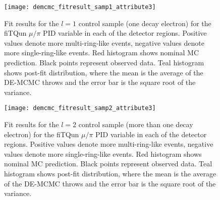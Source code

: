 \begin{figure}[h]
  \begin{center}
    \texttt{[image: demcmc\_fitresult\_samp1\_attribute3]} 
  \end{center}
  \caption{Fit results for the $l=1$ control sample (one decay electron) for
  the fiTQun $\mu/\pi$ PID variable in each of the detector regions.  Positive
  values denote more multi-ring-like events, negative values denote more
  single-ring-like events. Red histogram shows nominal MC prediction.  Black
  points represent observed data.  Teal histogram shows post-fit distribution,
  where the mean is the average of the DE-MCMC throws and the error bar is the
  square root of the variance.}
  \label{fig:fitresults_samp1_att3}
\end{figure}


\begin{figure}[h]
  \begin{center}
    \texttt{[image: demcmc\_fitresult\_samp2\_attribute3]} 
  \end{center}
  \caption{Fit results for the $l=2$ control sample (more than one decay
  electron) for the fiTQun $\mu/\pi$ PID variable in each of the detector
  regions.  Positive values denote more multi-ring-like events, negative values
  denote more single-ring-like events.  Red histogram shows nominal MC
  prediction.  Black points represent observed data.  Teal histogram shows
  post-fit distribution, where the mean is the average of the DE-MCMC throws
  and the error bar is the square root of the variance.}
  \label{fig:fitresults_samp2_att3}
\end{figure}



